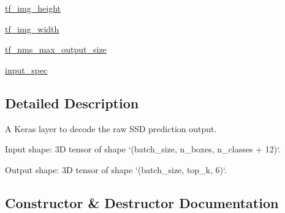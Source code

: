 \begin{DoxyCompactItemize}
\hyperlink{classkeras__utils_1_1keras__layer___decode_detections_1_1_decode_detections_a1c2b144c85cf22aaf4ceed592c9fa4c6}{tf\+\_\+img\+\_\+height}
\item 
\hyperlink{classkeras__utils_1_1keras__layer___decode_detections_1_1_decode_detections_a5f25fd4c14f3842a416faf0a6c910c83}{tf\+\_\+img\+\_\+width}
\item 
\hyperlink{classkeras__utils_1_1keras__layer___decode_detections_1_1_decode_detections_a7dfdb5fee748112e94d86ca0e4a9bd00}{tf\+\_\+nms\+\_\+max\+\_\+output\+\_\+size}
\item 
\hyperlink{classkeras__utils_1_1keras__layer___decode_detections_1_1_decode_detections_a3091a5032bc80c90d0cc23d521c6a2ea}{input\+\_\+spec}
\end{DoxyCompactItemize}


\subsection{Detailed Description}
\begin{DoxyVerb}A Keras layer to decode the raw SSD prediction output.

Input shape:
    3D tensor of shape `(batch_size, n_boxes, n_classes + 12)`.

Output shape:
    3D tensor of shape `(batch_size, top_k, 6)`.
\end{DoxyVerb}
 

\subsection{Constructor \& Destructor Documentation}
\mbox{\label{classkeras__utils_1_1keras__layer___decode_detections_1_1_decode_detections_ad194afad463d90638fbf361e995c7c37}} 
